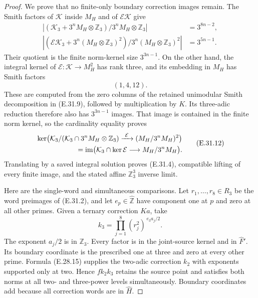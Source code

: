 \begin{proof}
We prove that no finite-only boundary correction
images remain.  The Smith factors of $\mathcal K$
inside $M_H$ and of $\mathcal E\mathcal K$ give
\[
 \begin{aligned}
 |(\mathcal K_3+3^nM_H\otimes\mathbb Z_3)/
                         3^nM_H\otimes\mathbb Z_3|
                                      &=3^{8n-2},\\
 |(\mathcal E\mathcal K_3+
          3^n(M_H\otimes\mathbb Z_3)^2)/
          3^n(M_H\otimes\mathbb Z_3)^2|
                                      &=3^{5n-1}.
 \end{aligned}
 \tag{E.31.10}
\]
Their quotient is the finite norm-kernel size
$3^{3n-1}$.  On the other hand, the integral
kernel of $\mathcal E:\mathcal K\to M_H^2$
has rank three, and its embedding in $M_H$
has Smith factors
\[
                              (1,4,12).
 \tag{E.31.11}
\]
These are computed from the zero columns of
the retained unimodular Smith decomposition
in (E.31.9), followed by multiplication by
$K$.  Its three-adic reduction therefore
also has $3^{3n-1}$ images.  That image is
contained in the finite norm kernel, so the
cardinality equality proves
\[
 \begin{split}
 &\ker\bigl(\mathcal K_3/
       (\mathcal K_3\cap3^nM_H\otimes\mathbb Z_3)
       \xrightarrow{\ \mathcal E\ }
       (M_H/3^nM_H)^2\bigr)\\
 &\hspace{20mm}=
 \operatorname{im}\bigl(
       \mathcal K_3\cap\ker\mathcal E
                  \longrightarrow M_H/3^nM_H\bigr).
 \end{split}
 \tag{E.31.12}
\]
Translating by a saved integral solution proves
(E.31.4), compatible lifting of every finite
image, and the stated affine $\mathbb Z_3^3$
inverse limit.

Here are the single-word and simultaneous
comparisons.  Let $r_1,\ldots,r_8\in R_3$ be the
word preimages of (E.31.2), and let $e_p\in
\widehat{\mathbb Z}$ have component one at $p$
and zero at all other primes.  Given a ternary
correction $Ka$, take
\[
                 k_3=\prod_{j=1}^8
                    (r_j^2)^{\,e_3a_j/2}.
 \tag{E.31.13}
\]
The exponent $a_j/2$ is in $\mathbb Z_3$.
Every factor is in the joint-source kernel
and in $\widehat F'$.  Its boundary coordinate
is the prescribed one at three and zero at
every other prime.  Formula (E.28.15) supplies
the two-adic correction $k_2$ with exponents
supported only at two.  Hence $fk_2k_3$ retains
the source point and satisfies both norms at
all two- and three-power levels simultaneously.
Boundary coordinates add because all correction
words are in $\widehat H$.


\end{proof}

